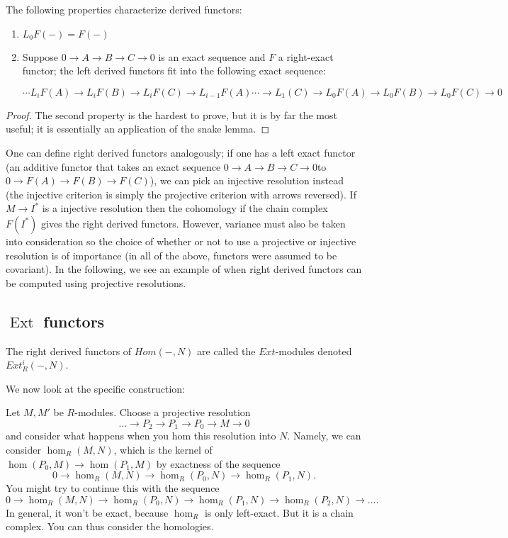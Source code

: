 \begin{theorem} The following properties characterize derived
functors: \begin{enumerate}
\item{ $L_0F(-)=F(-)$ }
\item{ Suppose $0\rightarrow A\rightarrow B\rightarrow
C\rightarrow 0$ is an exact sequence and $F$ a right-exact
functor; the left derived functors fit into the following exact
sequence:

\begin{equation} \cdots L_iF(A)\rightarrow L_iF(B)\rightarrow
L_iF(C)\rightarrow L_{i-1}F(A)\cdots\rightarrow
L_1(C)\rightarrow L_0F(A)\rightarrow L_0F(B)\rightarrow
L_0F(C)\rightarrow 0 \end{equation}}
\end{enumerate}
\end{theorem}
\begin{proof} The second property is the hardest to prove, but
it is by far the most useful; it is essentially an application
of the snake lemma. \end{proof}
One can define right derived functors analogously; if one has a
left exact functor (an additive functor that takes an exact
sequence $0\rightarrow A\rightarrow B\rightarrow C\rightarrow 0$to
$0\rightarrow F(A)\rightarrow F(B)\rightarrow F(C)$), we can
pick an injective resolution instead (the injective criterion is simply the
projective criterion with arrows reversed). If
$M\rightarrow I^*$ is a injective resolution then the cohomology if the chain
complex $F(I^*)$ gives the right derived functors.
However, variance must also be taken into consideration so the
choice of whether or not to use a projective or injective
resolution is of importance (in all of the above, functors were
assumed to be covariant). In the following, we see an example of when right
derived functors can be computed using projective
resolutions.

\newcommand{\ext}{\operatorname{Ext}}
\subsection{$\ext$ functors}

\begin{definition} The right derived functors of $Hom(-,N)$ are
called the $Ext$-modules denoted $Ext^i_R(-,N)$.
\end{definition}
We now look at the specific construction:

Let $M, M'$ be $R$-modules. Choose a projective resolution
\[ \dots \to P_2 \to P_1 \to P_0 \to M \to 0  \]
and consider what happens when you hom this resolution into $N$.
Namely, we can
consider $\hom_R(M,N)$, which is the kernel of $\hom(P_0, M)
\to\hom(P_1, M) $
by exactness of the sequence
\[ 0 \to \hom_R(M,N) \to \hom_R(P_0, N) \to \hom_R(P_1, N) . \]
You might try to continue this with the sequence
\[ 0 \to \hom_R(M,N) \to \hom_R(P_0, N) \to \hom_R(P_1, N) \to
\hom_R(P_2, N)
\to \dots. \]
In general, it won't be exact, because $\hom_R$ is only
left-exact. But it is a
chain complex. You can thus consider the homologies.

